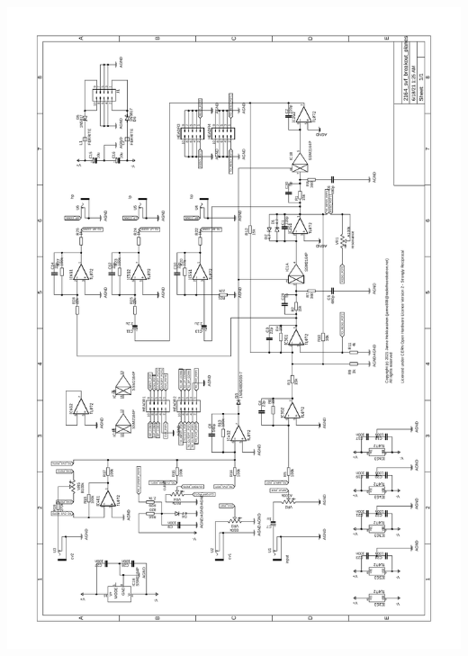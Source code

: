 \documentclass{article}
\begin{document}
\centering
\includegraphics[page=1, scale=0.6]{2164_svf_through-hole_schematic.pdf}
\end{document}
